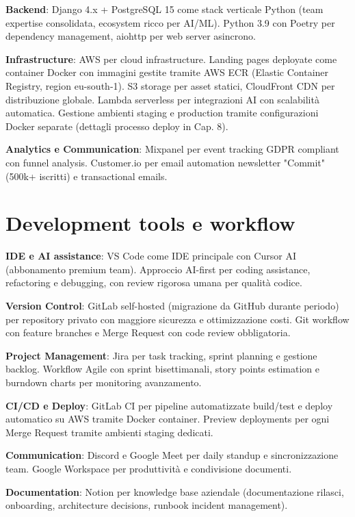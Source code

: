 \textbf{Backend}: Django 4.x + PostgreSQL 15 come stack verticale Python (team expertise consolidata, ecosystem ricco per AI/ML). Python 3.9 con Poetry per dependency management, aiohttp per web server asincrono.

\textbf{Infrastructure}: AWS per cloud infrastructure. Landing pages deployate come container Docker con immagini gestite tramite AWS ECR (Elastic Container Registry, region eu-south-1). S3 storage per asset statici, CloudFront CDN per distribuzione globale. Lambda serverless per integrazioni AI con scalabilità automatica. Gestione ambienti staging e production tramite configurazioni Docker separate (dettagli processo deploy in Cap. 8).

\textbf{Analytics e Communication}: Mixpanel per event tracking GDPR compliant con funnel analysis. Customer.io per email automation newsletter "Commit" (500k+ iscritti) e transactional emails.

\section{Development tools e workflow}

\textbf{IDE e AI assistance}: VS Code come IDE principale con Cursor AI (abbonamento premium team). Approccio AI-first per coding assistance, refactoring e debugging, con review rigorosa umana per qualità codice.

\textbf{Version Control}: GitLab self-hosted (migrazione da GitHub durante periodo) per repository privato con maggiore sicurezza e ottimizzazione costi. Git workflow con feature branches e Merge Request con code review obbligatoria.

\textbf{Project Management}: Jira per task tracking, sprint planning e gestione backlog. Workflow Agile con sprint bisettimanali, story points estimation e burndown charts per monitoring avanzamento.

\textbf{CI/CD e Deploy}: GitLab CI per pipeline automatizzate build/test e deploy 
automatico su AWS tramite Docker container. Preview deployments per ogni 
Merge Request tramite ambienti staging dedicati.

\textbf{Communication}: Discord e Google Meet per daily standup e sincronizzazione team. Google Workspace per produttività e condivisione documenti.

\textbf{Documentation}: Notion per knowledge base aziendale (documentazione rilasci, onboarding, architecture decisions, runbook incident management).
